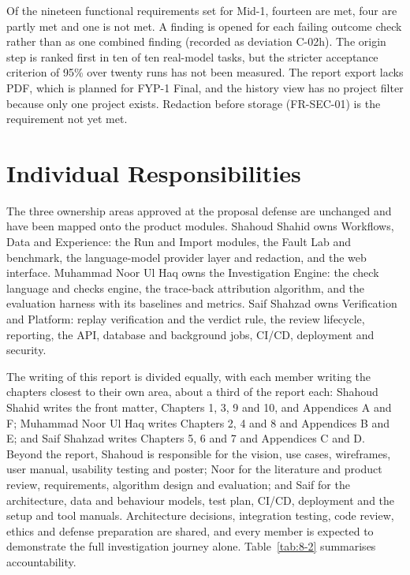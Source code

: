 \documentclass{fast-nuces-bs}
\begin{document}
Of the nineteen functional requirements set for Mid-1, fourteen are met, four are partly met and one is not met. A finding is opened for each failing outcome check rather than as one combined finding (recorded as deviation C-02h). The origin step is ranked first in ten of ten real-model tasks, but the stricter acceptance criterion of 95\% over twenty runs has not been measured. The report export lacks PDF, which is planned for FYP-1 Final, and the history view has no project filter because only one project exists. Redaction before storage (FR-SEC-01) is the requirement not yet met.

\section{Individual Responsibilities}

The three ownership areas approved at the proposal defense are unchanged and have been mapped onto the product modules. Shahoud Shahid owns Workflows, Data and Experience: the Run and Import modules, the Fault Lab and benchmark, the language-model provider layer and redaction, and the web interface. Muhammad Noor Ul Haq owns the Investigation Engine: the check language and checks engine, the trace-back attribution algorithm, and the evaluation harness with its baselines and metrics. Saif Shahzad owns Verification and Platform: replay verification and the verdict rule, the review lifecycle, reporting, the API, database and background jobs, CI/CD, deployment and security.

The writing of this report is divided equally, with each member writing the chapters closest to their own area, about a third of the report each: Shahoud Shahid writes the front matter, Chapters 1, 3, 9 and 10, and Appendices A and F; Muhammad Noor Ul Haq writes Chapters 2, 4 and 8 and Appendices B and E; and Saif Shahzad writes Chapters 5, 6 and 7 and Appendices C and D. Beyond the report, Shahoud is responsible for the vision, use cases, wireframes, user manual, usability testing and poster; Noor for the literature and product review, requirements, algorithm design and evaluation; and Saif for the architecture, data and behaviour models, test plan, CI/CD, deployment and the setup and tool manuals. Architecture decisions, integration testing, code review, ethics and defense preparation are shared, and every member is expected to demonstrate the full investigation journey alone. Table~\ref{tab:8-2} summarises accountability.
\end{document}
